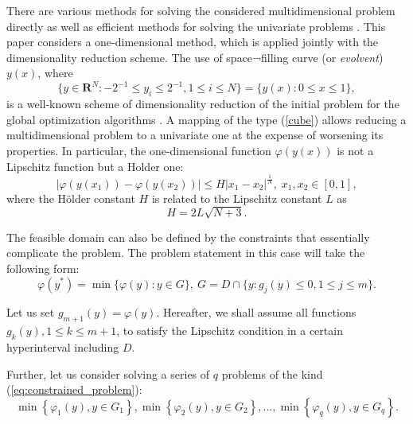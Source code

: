 \documentclass[runningheads]{llncs}
\begin{document}
There are various methods for solving the considered multidimensional problem directly
\cite{SergeyevKvasov2017, Jones2009} as well as efficient methods for solving the univariate problems \cite{Norkin1992, Strongin2000}.
This paper considers a one-dimensional method, which is applied jointly with
the dimensionality reduction scheme.
The use of space¬filling curve (or \textit{evolvent}) $y(x)$, where
\begin{equation}
\label{cube}
\lbrace y\in \mathbf{R}^N:-2^{-1}\leqslant y_i\leqslant 2^{-1},1\leqslant i\leqslant
N\rbrace=\{y(x):0\leqslant x\leqslant 1\},
\end{equation}
 is a well-known scheme of dimensionality reduction
 of the initial problem for the global optimization algorithms
\cite{Sergeyev2013}.
A mapping of the type (\ref{cube}) allows reducing a multidimensional problem to a univariate one at the expense of worsening its properties. In particular, the
one-dimensional function \(\varphi(y(x))\) is not a Lipschitz function but a Holder one:
\begin{displaymath}
\label{holder}
|\varphi(y(x_1))-\varphi(y(x_2))|\leqslant H{|x_1-x_2|}^{\frac{1}{N}}, \; x_1,x_2\in[0,1],
\end{displaymath}
where the H\"{o}lder constant \(H\) is related to the Lipschitz constant \(L\) as
\begin{displaymath}
  H=2L\sqrt{N+3}.
\end{displaymath}

The feasible domain can also be defined by the constraints that essentially complicate the problem.
The problem statement in this case will take the following form:
\begin{equation}
  \label{eq:constrained_problem}
  \varphi(y^*)=\min\{\varphi(y):y\in G\},\:G=D \cap \{y: g_j(y)\leqslant 0, 1\leqslant j\leqslant m\}.
\end{equation}

Let us set \(g_{m+1}(y)=\varphi(y)\). Hereafter, we shall assume all functions
\(g_k(y),1\leqslant k \leqslant m+1\),
to satisfy the Lipschitz condition in a certain hyperinterval including \(D\).

Further, let us consider solving a series of \(q\) problems of the kind
(\ref{eq:constrained_problem}):
\begin{equation}
  \label{eq:many_problems}
  \min\left\{\varphi_1(y), y\in G_1 \right\}, \min\left\{\varphi_2(y), y\in G_2\right\},...,
\min\left\{\varphi_q(y), y\in G_q\right\}.
\end{equation}
\end{document}
